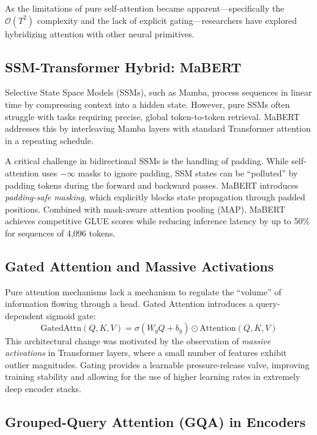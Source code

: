 \documentclass[11pt]{article}
\begin{document}
As the limitations of pure self-attention became apparent—specifically the $\mathcal{O}(T^2)$ complexity and the lack of explicit gating—researchers have explored hybridizing attention with other neural primitives.

\subsection{SSM-Transformer Hybrid: MaBERT}

Selective State Space Models (SSMs), such as Mamba, process sequences in linear time by compressing context into a hidden state. However, pure SSMs often struggle with tasks requiring precise, global token-to-token retrieval. MaBERT addresses this by interleaving Mamba layers with standard Transformer attention in a repeating schedule.

A critical challenge in bidirectional SSMs is the handling of padding. While self-attention uses $-\infty$ masks to ignore padding, SSM states can be ``polluted'' by padding tokens during the forward and backward passes. MaBERT introduces \emph{padding-safe masking}, which explicitly blocks state propagation through padded positions. Combined with mask-aware attention pooling (MAP), MaBERT achieves competitive GLUE scores while reducing inference latency by up to 50\% for sequences of 4,096 tokens.

\subsection{Gated Attention and Massive Activations}

Pure attention mechanisms lack a mechanism to regulate the ``volume'' of information flowing through a head. Gated Attention introduces a query-dependent sigmoid gate:
\begin{equation}
  \text{GatedAttn}(Q,K,V) = \sigma(W_g Q + b_g) \odot \text{Attention}(Q,K,V)
\end{equation}
This architectural change was motivated by the observation of \emph{massive activations} in Transformer layers, where a small number of features exhibit outlier magnitudes. Gating provides a learnable pressure-release valve, improving training stability and allowing for the use of higher learning rates in extremely deep encoder stacks.

\subsection{Grouped-Query Attention (GQA) in Encoders}
\end{document}
